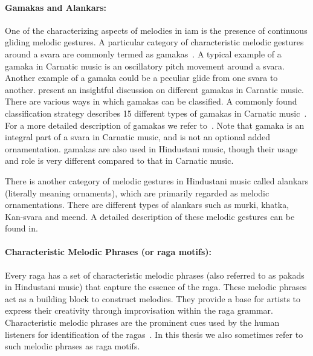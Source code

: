 \paragraph{Gamakas and Alankars:} One of the characterizing aspects of melodies in \gls{iam} is the presence of continuous gliding melodic gestures. A particular category of characteristic melodic gestures around a \gls{svara} are commonly termed as \glspl{gamaka}~\citep{krishna2012carnatic}. A typical example of a \gls{gamaka} in Carnatic music is an oscillatory pitch movement around a \gls{svara}. Another example of a \gls{gamaka} could be a peculiar glide from one \gls{svara} to another. \cite{krishna2012carnatic} present an insightful discussion on different \glspl{gamaka} in Carnatic music. There are various ways in which \glspl{gamaka} can be classified. A commonly found classification strategy describes 15 different types of \glspl{gamaka} in Carnatic music~\cite{ramanathan1999musical,janakiraman2008essentials,narayanswami2011}. For a more detailed description of \glspl{gamaka} we refer to~\citep{narayanswami2011}. Note that \gls{gamaka} is an integral part of a \gls{svara} in Carnatic music, and is not an optional added ornamentation. \Glspl{gamaka} are also used in Hindustani music, though their usage and role is very different compared to that in Carnatic music. 

There is another category of melodic gestures in Hindustani music called \glspl{alankar} (literally meaning ornaments), which are primarily regarded as melodic ornamentations. There are different types of \glspl{alankar} such as \gls{murki}, \gls{khatka}, Kan-\gls{svara} and \gls{meend}. A detailed description of these melodic gestures can be found in. 


\paragraph{Characteristic Melodic Phrases (or \gls{raga} motifs):} Every \gls{raga} has a set of characteristic melodic phrases (also referred to as pakads in Hindustani music) that capture the essence of the \gls{raga}. These melodic phrases act as a building block to construct melodies. They provide a base for artists to express their creativity through improvisation within the \gls{raga} grammar. Characteristic melodic phrases are the prominent cues used by the human listeners for identification of the \glspl{raga}~\citep{krishna2012carnatic}. In this thesis we also sometimes refer to such melodic phrases as \gls{raga} motifs.

